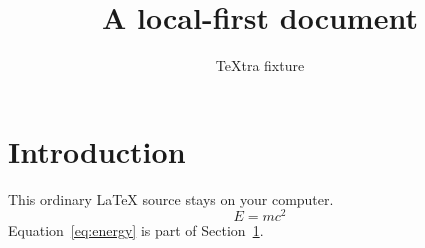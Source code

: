 \documentclass{article}
\title{A local-first document}
\author{TeXtra fixture}
\date{}
\begin{document}
\maketitle
\section{Introduction}\label{sec:introduction}
This ordinary LaTeX source stays on your computer.
\begin{equation}\label{eq:energy}
  E = mc^2
\end{equation}
Equation~\ref{eq:energy} is part of Section~\ref{sec:introduction}.
\end{document}
